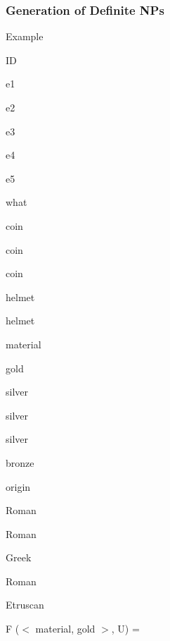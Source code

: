 \documentclass[compress,color=usenames]{beamer}
\begin{document}
\begin{frame}
\frametitle{
Generation of Deﬁnite NPs}



Example



ID



e1



e2



e3



e4



e5






what



coin



coin



coin



helmet



helmet






material



gold



silver



silver



silver



bronze






origin



Roman



Roman



Greek



Roman



Etruscan






F ($<$ material, gold $>$, U) =


\end{frame}
\end{document}
